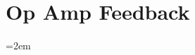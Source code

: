 \documentclass[12pt, fleqn]{article}
\begin{document}
\section{Op Amp Feedback}
%
\newpage
\appendix

\newpage
{}
\emergencystretch=2em
\nocite{*}
\printbibliography
\end{document}
